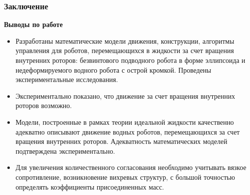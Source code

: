 \begin{frame}
\frametitle{Заключение}


\textbf{Выводы по работе}

\begin{itemize}
	\item Разработаны математические модели движения, конструкции, алгоритмы управления для роботов, перемещающихся в жидкости за счет вращения внутренних роторов: безвинтового подводного робота в форме эллипсоида и недеформируемого водного робота с острой кромкой. Проведены экспериментальные исследования.
	\item Экспериментально показано, что движение за счет вращения внутренних роторов возможно.
	\item Модели, построенные в рамках теории идеальной жидкости качественно адекватно описывают движение водных роботов, перемещающихся за счет вращения внутренних роторов. Адекватность математических моделей подтверждена экспериментально. 
	\item Для увеличения количественного согласования необходимо учитывать вязкое сопротивление, возникновение вихревых структур, с большой точностью определять коэффициенты присоединенных масс.
\end{itemize}

\end{frame}

